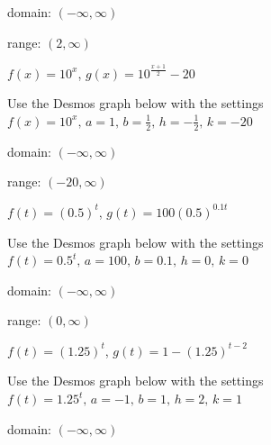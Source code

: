 \documentclass{ximera}
\begin{document}
\begin{question}
\begin{problem}
\begin{solution}
\begin{center} 
\end{center}

domain: $(-\infty, \infty)$

range: $(2, \infty)$

\end{solution}
\end{problem} 

\begin{problem}
$f(x) = 10^{x}$, $g(x) = 10^{\frac{x+1}{2}} - 20$ 

\begin{solution}
Use the Desmos graph below with the settings $f(x)=10^x,\,a=1,\,b=\frac{1}{2},\,h=-\frac{1}{2},\,k=-20$

\begin{center} 
\end{center}

domain: $(-\infty, \infty)$

range: $(-20, \infty)$

\end{solution}
\end{problem}  

\begin{problem}
$f(t) = (0.5)^{t}$, $g(t) = 100(0.5)^{0.1t}$

\begin{solution}
Use the Desmos graph below with the settings $f(t)=0.5^t,\,a=100,\,b=0.1,\,h=0,\,k=0$

\begin{center} 
\end{center}

domain: $(-\infty, \infty)$

range: $(0, \infty)$

\end{solution}
\end{problem}
  
\begin{problem}
$f(t) = (1.25)^{t}$, $g(t) = 1 - (1.25)^{t-2}$

\begin{solution}
Use the Desmos graph below with the settings $f(t)=1.25^t,\,a=-1,\,b=1,\,h=2,\,k=1$

\begin{center} 
\end{center}

domain: $(-\infty, \infty)$


\end{solution}
\end{problem}
\end{question}
\end{document}
